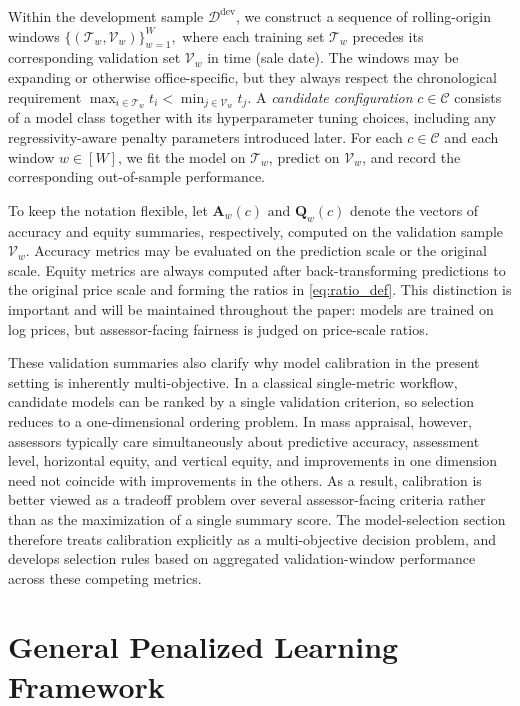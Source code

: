 \documentclass[12pt, draft]{article}
\theoremstyle{plain}
\theoremstyle{definition}
\newcommand{\1}{\mathbf{1}}
\newcommand{\D}{\mathcal{D}}
\begin{document}
{Within the development sample $\D^\mathrm{dev}$, we construct a sequence of rolling-origin windows
$\{(\mathcal{T}_w,\mathcal{V}_w)\}_{w=1}^W,$
where each training set $\mathcal{T}_w$ precedes its corresponding validation set $\mathcal{V}_w$ in time (sale date). The windows may be expanding or otherwise office-specific, but they always respect the chronological requirement
$
\max_{i\in \mathcal{T}_w} t_i
<
\min_{j\in \mathcal{V}_w} t_j.
$
A \emph{candidate configuration} $c\in\mathcal{C}$ consists of a model class together with its hyperparameter tuning choices, including any regressivity-aware penalty parameters introduced later. For each $c\in\mathcal{C}$ and each window $w \in [W]$, we fit the model on $\mathcal{T}_w$, predict on $\mathcal{V}_w$, and record the corresponding out-of-sample performance.

To keep the notation flexible, let
$
\mathbf{A}_w(c)
\text{ and }
\mathbf{Q}_w(c)
$
denote the vectors of accuracy and equity summaries, respectively, computed on the validation sample $\mathcal{V}_w$. Accuracy metrics may be evaluated on the prediction scale or the original scale. Equity metrics are always computed after back-transforming predictions to the original price scale and forming the ratios in \eqref{eq:ratio_def}. This distinction is important and will be maintained throughout the paper: models are trained on log prices, but assessor-facing fairness is judged on price-scale ratios.

These validation summaries also clarify why model calibration in the present setting is inherently multi-objective. In a classical single-metric workflow, candidate models can be ranked by a single validation criterion, so selection reduces to a one-dimensional ordering problem. In mass appraisal, however, assessors typically care simultaneously about predictive accuracy, assessment level, horizontal equity, and vertical equity, and improvements in one dimension need not coincide with improvements in the others. As a result, calibration is better viewed as a tradeoff problem over several assessor-facing criteria rather than as the maximization of a single summary score. The model-selection section therefore treats calibration explicitly as a multi-objective decision problem, and develops selection rules based on aggregated validation-window performance across these competing metrics.

\section{General Penalized Learning Framework}

}
\end{document}
